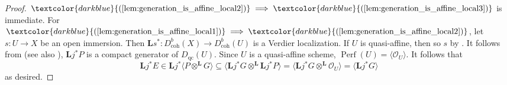 \documentclass[11pt]{amsart}
\def\eqref#1{\textcolor{darkblue}{(\ref{#1})}}
\theoremstyle{plain}
\theoremstyle{definition}
\numberwithin{equation}{section}
\numberwithin{theorem}{section}
\begin{document}
\begin{proof}
    $\eqref{lem:generation_is_affine_local2} \implies \eqref{lem:generation_is_affine_local3}$ is immediate. 
    For $\eqref{lem:generation_is_affine_local1} \implies \eqref{lem:generation_is_affine_local2}$, let $s\colon U\to X$ be an open immersion. 
    Then $\mathbf{L}s^\ast \colon D^b_{\operatorname{coh}}(X) \to D^b_{\operatorname{coh}}(U)$ is a Verdier localization. 
    If $U$ is quasi-affine, then so $s$ by \cite[\href{https://stacks.math.columbia.edu/tag/054G}{Tag 054G}]{stacks-project}. 
    It follows from \cite[Lemma 2.6 and Example 3.11]{Hall/Rydh:2017} (see also \cite[Corollary 3.6]{Lank:2026}), $\mathbf{L}j^\ast P$ is a compact generator of $D_{\operatorname{qc}}(U)$. 
    Since $U$ is a quasi-affine scheme, $\operatorname{Perf}(U)=\langle\mathcal{O}_U\rangle$. 
    It follows that 
    \begin{displaymath}
        \mathbf{L}j^\ast E \in\mathbf{L}j^\ast\langle P \otimes^{\mathbf{L}} G \rangle\subseteq \langle \mathbf{L}j^\ast G\otimes^{\mathbf{L}}\mathbf{L}j^\ast P\rangle=\langle \mathbf{L}j^\ast G\otimes^{\mathbf{L}}\mathcal{O}_U\rangle=\langle \mathbf{L}j^\ast G \rangle
    \end{displaymath}
    as desired. 


\end{proof}
\end{document}
